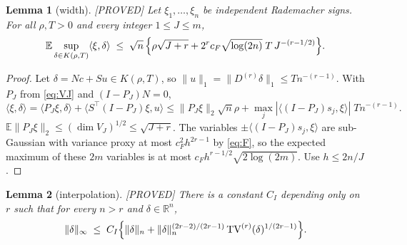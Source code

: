 \documentclass[11pt]{article}
\newtheorem{lemma}{Lemma}
\theoremstyle{definition}
\theoremstyle{remark}
\newcommand{\R}{\mathbb{R}}
\newcommand{\E}{\mathbb{E}}
\newcommand{\TV}{\mathrm{TV}}
\newcommand{\Dr}{D^{(r)}}
\newcommand{\nn}[1]{\|#1\|_n}
\newcommand{\proved}{\textup{[PROVED]}}
\begin{document}
\begin{lemma}[width]\label{lem:width}\proved{}
Let $\xi_1,\dots,\xi_n$ be independent Rademacher signs. For all $\rho,T>0$ and every integer $1\le J\le m$,
\[
\E\sup_{\delta\in K(\rho,T)}\langle\xi,\delta\rangle\;\le\;\sqrt n\,\Bigl\{\rho\sqrt{J+r}+2^{r}c_F\sqrt{\log(2n)}\;T\,J^{-(r-1/2)}\Bigr\}.
\]
\end{lemma}

\begin{proof}
Let $\delta=Nc+Su\in K(\rho,T)$, so $\|u\|_1=\|\Dr\delta\|_1\le Tn^{-(r-1)}$. With $P_J$ from \eqref{eq:VJ} and $(I-P_J)N=0$,
\[
\langle\xi,\delta\rangle=\langle P_J\xi,\delta\rangle+\langle S^\top(I-P_J)\xi,u\rangle\le\|P_J\xi\|_2\sqrt n\rho+\max_j|\langle(I-P_J)s_j,\xi\rangle|\;Tn^{-(r-1)}.
\]
$\E\|P_J\xi\|_2\le(\dim V_J)^{1/2}\le\sqrt{J+r}$. The variables $\pm\langle(I-P_J)s_j,\xi\rangle$ are sub-Gaussian with variance proxy at most $c_F^2h^{2r-1}$ by \eqref{eq:F}, so the expected maximum of these $2m$ variables is at most $c_Fh^{r-1/2}\sqrt{2\log(2m)}$. Use $h\le2n/J$.
\end{proof}

\begin{lemma}[interpolation]\label{lem:interp}\proved{}
There is a constant $C_I$ depending only on $r$ such that for every $n>r$ and $\delta\in\R^n$,
\[
\|\delta\|_\infty\;\le\;C_I\Bigl\{\nn{\delta}+\nn{\delta}^{(2r-2)/(2r-1)}\,\TV^{(r)}(\delta)^{1/(2r-1)}\Bigr\}.
\]
\end{lemma}
\end{document}
